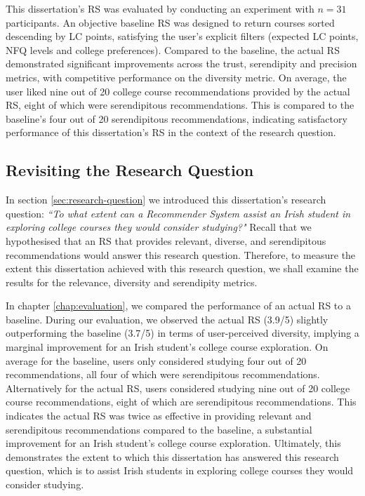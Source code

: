This dissertation's RS was evaluated by conducting an experiment with $n=31$ participants.
An objective baseline RS was designed to return courses sorted descending by LC points, 
satisfying the user's explicit filters (expected LC points, NFQ levels and college preferences).
Compared to the baseline, the actual RS demonstrated significant improvements across the trust, serendipity and precision metrics,
with competitive performance on the diversity metric.
On average, the user liked nine out of 20 college course recommendations provided by the actual RS,
eight of which were serendipitous recommendations.
This is compared to the baseline's four out of 20 serendipitous recommendations,
indicating satisfactory performance of this dissertation's RS in the context of the research question.

\subsection{Revisiting the Research Question}

In section \ref{sec:research-question} we introduced this dissertation's research question:
\emph{``To what extent can a Recommender System assist an Irish student in exploring college courses they would consider studying?"}
Recall that we hypothesised that an RS that provides relevant, diverse, and serendipitous recommendations would answer this research question.
Therefore, to measure the extent this dissertation achieved with this research question,
we shall examine the results for the relevance, diversity and serendipity metrics.

In chapter \ref{chap:evaluation}, we compared the performance of an actual RS to a baseline. 
During our evaluation, we observed the actual RS (3.9/5) slightly outperforming the baseline (3.7/5) in terms of user-perceived diversity,
implying a marginal improvement for an Irish student's college course exploration.
On average for the baseline, users only considered studying four out of 20 recommendations,
all four of which were serendipitous recommendations.
Alternatively for the actual RS, 
users considered studying nine out of 20 college course recommendations,
eight of which are serendipitous recommendations.
This indicates the actual RS was twice as effective in providing relevant and serendipitous recommendations compared to the baseline,
a substantial improvement for an Irish student's college course exploration.
Ultimately, this demonstrates the extent to which this dissertation has answered this research question,
which is to assist Irish students in exploring college courses they would consider studying.

